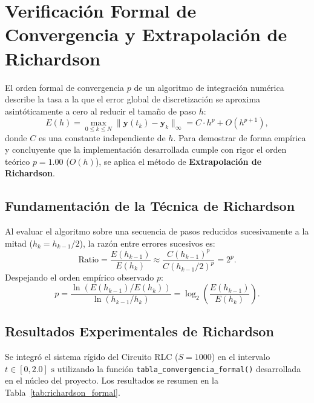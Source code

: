 \documentclass[11pt,a4paper]{article}
\begin{document}
\section{Verificación Formal de Convergencia y Extrapolación de Richardson}

El orden formal de convergencia $p$ de un algoritmo de integración numérica describe la tasa a la que el error global de discretización se aproxima asintóticamente a cero al reducir el tamaño de paso $h$:
\begin{equation}
    E(h) = \max_{0 \le k \le N} \|\mathbf{y}(t_k) - \mathbf{y}_k\|_\infty = C \cdot h^p + O(h^{p+1}),
\end{equation}
donde $C$ es una constante independiente de $h$. Para demostrar de forma empírica y concluyente que la implementación desarrollada cumple con rigor el orden teórico $p = 1.00$ ($O(h)$), se aplica el método de \textbf{Extrapolación de Richardson}.

\subsection{Fundamentación de la Técnica de Richardson}
Al evaluar el algoritmo sobre una secuencia de pasos reducidos sucesivamente a la mitad ($h_k = h_{k-1}/2$), la razón entre errores sucesivos es:
\begin{equation}
    \text{Ratio} = \frac{E(h_{k-1})}{E(h_k)} \approx \frac{C (h_{k-1})^p}{C (h_{k-1}/2)^p} = 2^p.
\end{equation}
Despejando el orden empírico observado $p$:
\begin{equation}
    p = \frac{\ln\left( E(h_{k-1}) / E(h_k) \right)}{\ln\left( h_{k-1} / h_k \right)} = \log_2\left( \frac{E(h_{k-1})}{E(h_k)} \right).
    \label{eq:richardson_p}
\end{equation}

\subsection{Resultados Experimentales de Richardson}
Se integró el sistema rígido del Circuito RLC ($S = 1000$) en el intervalo $t \in [0, 2.0]\text{ s}$ utilizando la función \texttt{tabla\_convergencia\_formal()} desarrollada en el núcleo del proyecto. Los resultados se resumen en la Tabla~\ref{tab:richardson_formal}.
\end{document}
